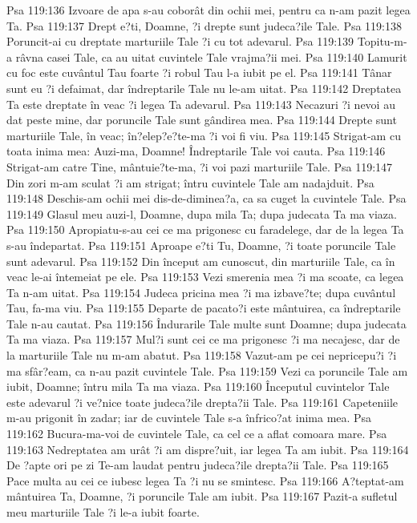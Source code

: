 Psa 119:136  Izvoare de apa s-au coborât din ochii mei, pentru ca n-am pazit legea Ta.
Psa 119:137  Drept e?ti, Doamne, ?i drepte sunt judeca?ile Tale.
Psa 119:138  Poruncit-ai cu dreptate marturiile Tale ?i cu tot adevarul.
Psa 119:139  Topitu-m-a râvna casei Tale, ca au uitat cuvintele Tale vrajma?ii mei.
Psa 119:140  Lamurit cu foc este cuvântul Tau foarte ?i robul Tau l-a iubit pe el.
Psa 119:141  Tânar sunt eu ?i defaimat, dar îndreptarile Tale nu le-am uitat.
Psa 119:142  Dreptatea Ta este dreptate în veac ?i legea Ta adevarul.
Psa 119:143  Necazuri ?i nevoi au dat peste mine, dar poruncile Tale sunt gândirea mea.
Psa 119:144  Drepte sunt marturiile Tale, în veac; în?elep?e?te-ma ?i voi fi viu.
Psa 119:145  Strigat-am cu toata inima mea: Auzi-ma, Doamne! Îndreptarile Tale voi cauta.
Psa 119:146  Strigat-am catre Tine, mântuie?te-ma, ?i voi pazi marturiile Tale.
Psa 119:147  Din zori m-am sculat ?i am strigat; întru cuvintele Tale am nadajduit.
Psa 119:148  Deschis-am ochii mei dis-de-diminea?a, ca sa cuget la cuvintele Tale.
Psa 119:149  Glasul meu auzi-l, Doamne, dupa mila Ta; dupa judecata Ta ma viaza.
Psa 119:150  Apropiatu-s-au cei ce ma prigonesc cu faradelege, dar de la legea Ta s-au îndepartat.
Psa 119:151  Aproape e?ti Tu, Doamne, ?i toate poruncile Tale sunt adevarul.
Psa 119:152  Din început am cunoscut, din marturiile Tale, ca în veac le-ai întemeiat pe ele.
Psa 119:153  Vezi smerenia mea ?i ma scoate, ca legea Ta n-am uitat.
Psa 119:154  Judeca pricina mea ?i ma izbave?te; dupa cuvântul Tau, fa-ma viu.
Psa 119:155  Departe de pacato?i este mântuirea, ca îndreptarile Tale n-au cautat.
Psa 119:156  Îndurarile Tale multe sunt Doamne; dupa judecata Ta ma viaza.
Psa 119:157  Mul?i sunt cei ce ma prigonesc ?i ma necajesc, dar de la marturiile Tale nu m-am abatut.
Psa 119:158  Vazut-am pe cei nepricepu?i ?i ma sfâr?eam, ca n-au pazit cuvintele Tale.
Psa 119:159  Vezi ca poruncile Tale am iubit, Doamne; întru mila Ta ma viaza.
Psa 119:160  Începutul cuvintelor Tale este adevarul ?i ve?nice toate judeca?ile drepta?ii Tale.
Psa 119:161  Capeteniile m-au prigonit în zadar; iar de cuvintele Tale s-a înfrico?at inima mea.
Psa 119:162  Bucura-ma-voi de cuvintele Tale, ca cel ce a aflat comoara mare.
Psa 119:163  Nedreptatea am urât ?i am dispre?uit, iar legea Ta am iubit.
Psa 119:164  De ?apte ori pe zi Te-am laudat pentru judeca?ile drepta?ii Tale.
Psa 119:165  Pace multa au cei ce iubesc legea Ta ?i nu se smintesc.
Psa 119:166  A?teptat-am mântuirea Ta, Doamne, ?i poruncile Tale am iubit.
Psa 119:167  Pazit-a sufletul meu marturiile Tale ?i le-a iubit foarte.
